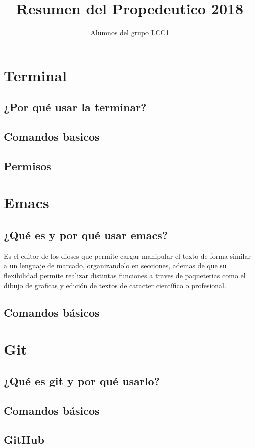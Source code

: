 \documentclass[11pt,letterpaper]{article}
\title{Resumen del Propedeutico 2018}
\author{Alumnos del grupo LCC1}
\begin{document}
\maketitle
\section{Terminal}
\subsection{¿Por qué usar la terminar?}
\subsection{Comandos basicos}
\subsection{Permisos}
\section{Emacs}
\subsection{¿Qué es y por qué usar emacs?}
Es el editor de los dioses que permite cargar manipular el texto de forma similar a un lenguaje de marcado, organizandolo en secciones, ademas de que su flexibilidad permite realizar distintas funciones a traves de paqueterias como el dibujo de graficas y edición de textos de caracter científico o profesional.
\subsection{Comandos básicos}
\section{Git}
\subsection{¿Qué es git y por qué usarlo?}
\subsection{Comandos básicos}
\subsection{GitHub}
\end{document}
